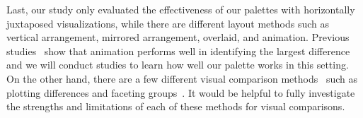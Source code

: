 Last, our study only evaluated the effectiveness of our palettes with horizontally juxtaposed visualizations, while there are different layout methods such as vertical arrangement, mirrored arrangement, overlaid, and animation. Previous studies~\cite{Ondov19} show that animation performs well in identifying the largest difference and we will conduct studies to learn how well our palette works in this setting. On the other hand, there are a few 
different visual comparison methods~\cite{Gleicher11} such as plotting differences and faceting groups~\cite{wickham2009elegant}. It would be helpful to fully investigate the strengths and limitations of each of these methods for visual comparisons.


